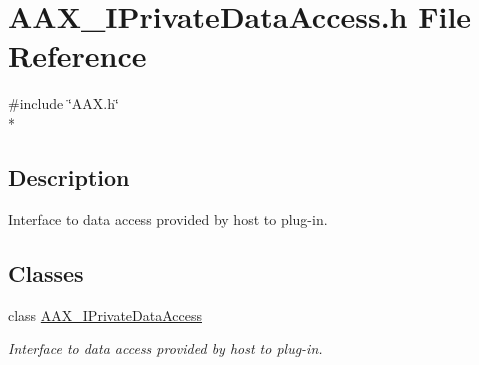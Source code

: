 \hypertarget{a00259}{}\section{A\+A\+X\+\_\+\+I\+Private\+Data\+Access.\+h File Reference}
\label{a00259}
{\ttfamily \#include \char`\"{}A\+A\+X.\+h\char`\"{}}\\*


\subsection{Description}
Interface to data access provided by host to plug-\/in. 

\subsection*{Classes}
\begin{DoxyCompactItemize}
\item 
class \hyperlink{a00111}{A\+A\+X\+\_\+\+I\+Private\+Data\+Access}
\begin{DoxyCompactList}\small\item\em Interface to data access provided by host to plug-\/in. \end{DoxyCompactList}\end{DoxyCompactItemize}
